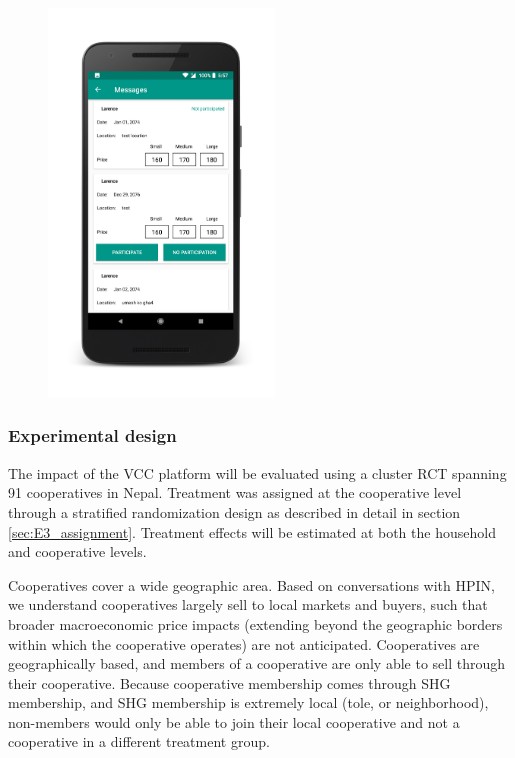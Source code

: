 \documentclass[11pt]{article}
\begin{document}
\begin{figure}[!h]
\begin{minipage}{.2\textwidth}
    \includegraphics[width=6cm]{vcc3.png}
  \end{minipage}
\end{figure}

\newpage


\vspace{2cm}
\subsubsection{Experimental design} \label{sec:E3_experimental.design}

The impact of the VCC platform will be evaluated using a cluster RCT spanning 91 cooperatives in Nepal. Treatment was assigned at the cooperative level through a stratified randomization design as described in detail in section \ref{sec:E3_assignment}.  Treatment effects will be estimated at both the household and cooperative levels. 

Cooperatives cover a wide geographic area.  Based on conversations with HPIN, we understand cooperatives largely sell to local markets and buyers, such that broader macroeconomic price impacts (extending beyond the geographic borders within which the cooperative operates) are not anticipated. Cooperatives are geographically based, and members of a cooperative are only able to sell through their cooperative. Because cooperative membership comes through SHG membership, and SHG membership is extremely local (tole, or neighborhood), non-members would only be able to join their local cooperative and not a cooperative in a different treatment group. 
\end{document}
